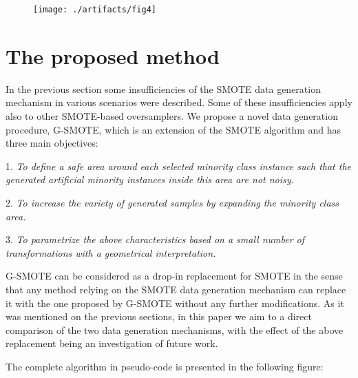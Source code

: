 \documentclass[parskip=full]{scrartcl}
\begin{document}
\begin{figure}[H]
	\centering
	\texttt{[image: ./artifacts/fig4]}
\end{figure}

\section{The proposed method}

In the previous section some insufficiencies of the SMOTE data generation
mechanism in various scenarios were described. Some of these insufficiencies
apply also to other SMOTE-based oversamplers. We propose a novel data generation
procedure, G-SMOTE, which is an extension of the SMOTE algorithm and has three
main objectives:

1. \textit{To define a safe area around each selected minority class instance
such that the generated artificial minority instances inside this area are not
noisy.}

2. \textit{To increase the variety of generated samples by expanding the
minority class area.}

3. \textit{To parametrize the above characteristics based on a small number of
transformations with a geometrical interpretation.}

G-SMOTE can be considered as a drop-in replacement for SMOTE in the sense that
any method relying on the SMOTE data generation mechanism can replace it with
the one proposed by G-SMOTE without any further modifications. As it was
mentioned on the previous sections, in this paper we aim to a direct comparison
of the two data generation mechanisms, with the effect of the above replacement
being an investigation of future work.

The complete algorithm in pseudo-code is presented in the following figure:
\end{document}
